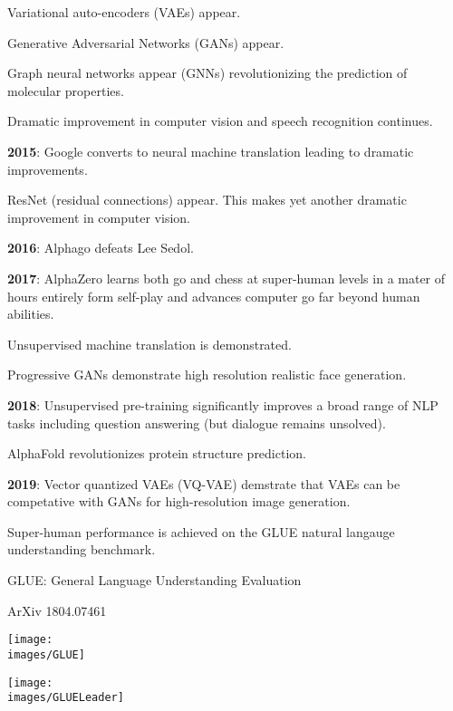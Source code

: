 {\vfill
Variational auto-encoders (VAEs) appear.

\vfill
Generative Adversarial Networks (GANs) appear.

\vfill
Graph neural networks appear (GNNs) revolutionizing the prediction of molecular properties.

\vfill
Dramatic improvement in computer vision and speech recognition continues.


{\bf 2015}: Google converts to neural machine translation leading to dramatic improvements.

\vfill
ResNet (residual connections) appear.  This makes yet another dramatic improvement in computer vision.

\vfill
{\bf 2016}: Alphago defeats Lee Sedol.


{\bf 2017}: AlphaZero learns both go and chess at super-human levels in a mater of hours entirely form self-play and advances computer go far beyond human abilities.

\vfill
Unsupervised machine translation is demonstrated.

\vfill
Progressive GANs demonstrate high resolution realistic face generation.


{\bf 2018}: Unsupervised pre-training significantly improves a broad range of NLP tasks including question answering (but dialogue remains unsolved).

\vfill
AlphaFold revolutionizes protein structure prediction.

\vfill{\bf 2019}:
Vector quantized VAEs (VQ-VAE) demstrate that VAEs can be competative with GANs for high-resolution image generation.

\vfill
Super-human performance is achieved on the GLUE natural langauge understanding benchmark.


GLUE: General Language Understanding Evaluation

\vfill

\centerline{\normalsize ArXiv 1804.07461}
\centerline{\texttt{[image: \\images/GLUE]}}


\centerline{\texttt{[image: \\images/GLUELeader]}}


}
